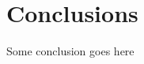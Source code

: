 \documentclass[letterpaper,12pt]{article}
\begin{document}
\section{Conclusions}

Some conclusion goes here
\\
\end{document}
